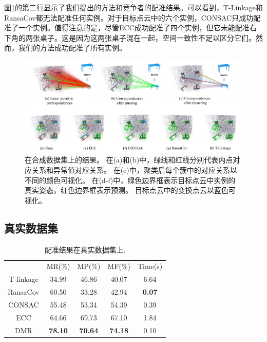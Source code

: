 图\ref{fig:DMR}的第二行显示了我们提出的方法和竞争者的配准结果。可以看到，T-Linkage和RansaCov都无法配准任何实例。对于目标点云中的六个实例，CONSAC只成功配准了一个实例。值得注意的是，尽管ECC成功配准了四个实例，但它未能配准右下角的两张桌子。这是因为这两张桌子混在一起，空间一致性不足以区分它们。然而，我们的方法成功配准了所有实例。

\begin{figure}
        \centering
        \includegraphics[width=1.0\textwidth]{images/DMR_syn.pdf}
        \caption{
                在合成数据集上的结果。
                在(a)和(b)中，绿线和红线分别代表内点对应关系和异常值对应关系。
                在(c)中，聚类后每个簇中的对应关系以不同的颜色可视化。
                在(d-f)中，绿色边界框表示目标点云中实例的真实姿态，红色边界框表示预测。
                目标点云中的变换点云以蓝色可视化。
        }
        \label{fig:DMR}
\end{figure}

\subsection{真实数据集}
\begin{table}[ht]
        \centering
        \caption{配准结果在真实数据集上.}
        \begin{tabular}{ccccc}
        \hline\noalign{\smallskip}
        & MR(\%)         & MP(\%)         & MF(\%)         & Time(s)       \\
        \noalign{\smallskip}
        \hline
        \noalign{\smallskip}
        T-linkage  & 34.99          & 46.86          & 40.07          & 6.64          \\
        RansaCov   & 60.50          & 33.28          & 42.94          & \textbf{0.07} \\
        CONSAC     & 55.48          & 53.34          & 54.39          & 0.39          \\
        ECC        & 64.66          & 69.73          & 67.10          & 1.84          \\
        DMR   & \textbf{78.10} & \textbf{70.64} & \textbf{74.18} & 0.10        \\ 
        \hline
        \end{tabular}
        \label{tab:DMR_real}
\end{table}
      
